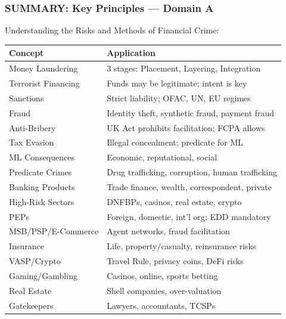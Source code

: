 \documentclass[12pt,aspectratio=169]{beamer}
\renewcommand{\scriptsize}{\fontsize{5}{6}\selectfont}
\newcommand{\keypoint}[1]{\textcolor{deepblue}{\textbf{#1}}}
\begin{document}
	\begin{frame}
		\frametitle{\fontsize{11}{13}\selectfont SUMMARY: Key Principles — Domain A}
		\scriptsize
		\begin{block}{\fontsize{9}{11}\selectfont Understanding the Risks and Methods of Financial Crime:}
			\vspace{0.05cm}
			\scriptsize
			\begin{tabular}{|p{}|p{}|}
				\hline
				\keypoint{Concept} & \keypoint{Application} \\
				\hline
				Money Laundering & 3 stages: Placement, Layering, Integration \\
				\hline
				Terrorist Financing & Funds may be legitimate; intent is key \\
				\hline
				Sanctions & Strict liability; OFAC, UN, EU regimes \\
				\hline
				Fraud & Identity theft, synthetic fraud, payment fraud \\
				\hline
				Anti-Bribery & UK Act prohibits facilitation; FCPA allows \\
				\hline
				Tax Evasion & Illegal concealment; predicate for ML \\
				\hline
				ML Consequences & Economic, reputational, social \\
				\hline
				Predicate Crimes & Drug trafficking, corruption, human trafficking \\
				\hline
				Banking Products & Trade finance, wealth, correspondent, private \\
				\hline
				High-Risk Sectors & DNFBPs, casinos, real estate, crypto \\
				\hline
				PEPs & Foreign, domestic, int'l org; EDD mandatory \\
				\hline
				MSB/PSP/E-Commerce & Agent networks, fraud facilitation \\
				\hline
				Insurance & Life, property/casualty, reinsurance risks \\
				\hline
				VASP/Crypto & Travel Rule, privacy coins, DeFi risks \\
				\hline
				Gaming/Gambling & Casinos, online, sports betting \\
				\hline
				Real Estate & Shell companies, over-valuation \\
				\hline
				Gatekeepers & Lawyers, accountants, TCSPs \\

\end{tabular}
\end{block}
\end{frame}
\end{document}
